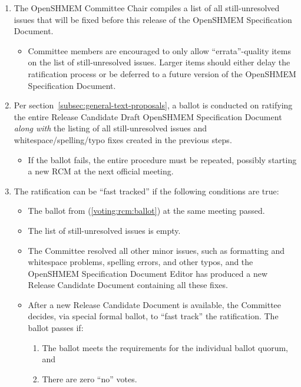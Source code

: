 \begin{enumerate}
\begin{enumerate}
  \item The OpenSHMEM Committee Chair compiles a list of all still-unresolved
    issues that will be fixed before this release of the OpenSHMEM Specification
    Document.
    \begin{itemize}
    \item Committee members are encouraged to only allow
      ``errata''-quality items on the list of still-unresolved
      issues.  Larger items should either delay the ratification
      process or be deferred to a future version of the OpenSHMEM Specification
      Document.
    \end{itemize}

  \item\label{voting:rcm:ballot} Per section~\ref{subsec:general-text-proposals}, a 
    ballot is conducted on ratifying the entire Release Candidate
    Draft OpenSHMEM Specification Document {\em along with} the listing of all
    still-unresolved issues and whitespace/spelling/typo fixes created
    in the previous steps.
    \begin{itemize}
    \item If the ballot fails, the entire procedure must be repeated,
      possibly starting a new RCM at the next official meeting.
    \end{itemize}

  \item The ratification can be ``fast tracked'' if the following
    conditions are true:

    \begin{itemize}
    \item The ballot from (\ref{voting:rcm:ballot}) at the
      same meeting passed.
    \item  The list of still-unresolved issues is empty.
    \item The Committee resolved all other minor issues, such as
      formatting and whitespace problems, spelling errors, and other
      typos, and the OpenSHMEM Specification Document Editor has produced a new
      Release Candidate Document containing all these fixes.
    \item After a new Release Candidate Document is available, the
      Committee decides, via special formal ballot, to ``fast track'' the
      ratification.  The ballot passes if:
      \begin{enumerate}
      \item The ballot meets the requirements for the individual
        ballot quorum, and
      \item There are zero ``no'' votes.
      \end{enumerate}
    \end{itemize}


\end{enumerate}
\end{enumerate}
